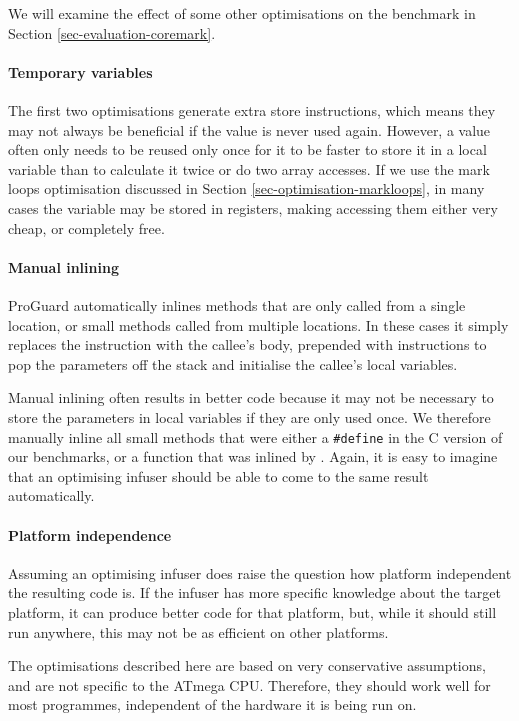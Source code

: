We will examine the effect of some other optimisations on the  benchmark in Section \ref{sec-evaluation-coremark}.

\paragraph{Temporary variables}
The first two optimisations generate extra store instructions, which means they may not always be beneficial if the value is never used again. However, a value often only needs to be reused only once for it to be faster to store it in a local variable than to calculate it twice or do two array accesses. If we use the mark loops optimisation discussed in Section \ref{sec-optimisation-markloops}, in many cases the variable may be stored in registers, making accessing them either very cheap, or completely free.

\paragraph{Manual inlining}
ProGuard automatically inlines methods that are only called from a single location, or small methods called from multiple locations. In these cases it simply replaces the  instruction with the callee's body, prepended with  instructions to pop the parameters off the stack and initialise the callee's local variables.

Manual inlining often results in better code because it may not be necessary to store the parameters in local variables if they are only used once. We therefore manually inline all small methods that were either a \texttt{\#define} in the C version of our benchmarks, or a function that was inlined by . Again, it is easy to imagine that an optimising infuser should be able to come to the same result automatically.



\paragraph{Platform independence}
Assuming an optimising infuser does raise the question how platform independent the resulting code is. If the infuser has more specific knowledge about the target platform, it can produce better code for that platform, but, while it should still run anywhere, this may not be as efficient on other platforms.

The optimisations described here are based on very conservative assumptions, and are not specific to the ATmega CPU. Therefore, they should work well for most programmes, independent of the hardware it is being run on.

